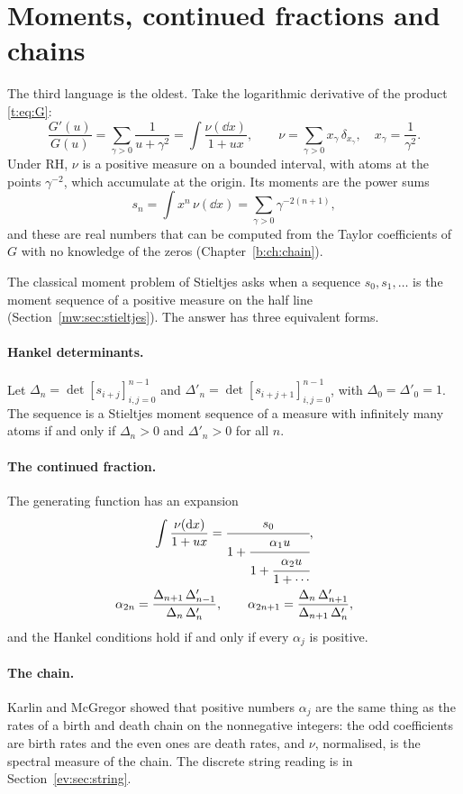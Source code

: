 \section{Moments, continued fractions and chains}\label{t:sec:moments}

The third language is the oldest. Take the logarithmic derivative of the product \eqref{t:eq:G}:
\[
\frac{G'(u)}{G(u)}=\sum_{\gamma>0}\frac{1}{u+\gamma^2}=\int\frac{\nu(\dd x)}{1+ux},\qquad \nu=\sum_{\gamma>0}x_\gamma\,\delta_{x_\gamma},\quad x_\gamma=\frac{1}{\gamma^2}.
\]
Under RH, $\nu$ is a positive measure on a bounded interval, with atoms at the points $\gamma^{-2}$, which accumulate at the origin. Its moments are the power sums
\[
s_n=\int x^n\,\nu(\dd x)=\sum_{\gamma>0}\gamma^{-2(n+1)},
\]
and these are real numbers that can be computed from the Taylor coefficients of $G$ with no knowledge of the zeros (Chapter~\ref{b:ch:chain}).

The classical moment problem of Stieltjes asks when a sequence $s_0,s_1,\dots$ is the moment sequence of a positive measure on the half line (Section~\ref{mw:sec:stieltjes}). The answer has three equivalent forms.

\paragraph{Hankel determinants.} Let $\Delta_n=\det[s_{i+j}]_{i,j=0}^{n-1}$ and $\Delta'_n=\det[s_{i+j+1}]_{i,j=0}^{n-1}$, with $\Delta_0=\Delta'_0=1$. The sequence is a Stieltjes moment sequence of a measure with infinitely many atoms if and only if $\Delta_n>0$ and $\Delta'_n>0$ for all $n$.

\paragraph{The continued fraction.} The generating function has an expansion
\begin{gather*}
\int\frac{\nu(\mathrm{d} x)}{1+ux}=\cfrac{s_0}{1+\cfrac{\alpha_1u}{1+\cfrac{\alpha_2u}{1+\cdots}}},\\
\alpha_{2n}=\frac{\Delta_{n+1}\,\Delta'_{n-1}}{\Delta_n\,\Delta'_n},\qquad
\alpha_{2n+1}=\frac{\Delta_n\,\Delta'_{n+1}}{\Delta_{n+1}\,\Delta'_n},
\end{gather*}
and the Hankel conditions hold if and only if every $\alpha_j$ is positive.

\paragraph{The chain.} Karlin and McGregor \cite{KarlinMcGregor57} showed that positive numbers $\alpha_j$ are the same thing as the rates of a birth and death chain on the nonnegative integers: the odd coefficients are birth rates and the even ones are death rates, and $\nu$, normalised, is the spectral measure of the chain. The discrete string reading is in Section~\ref{ev:sec:string}.


